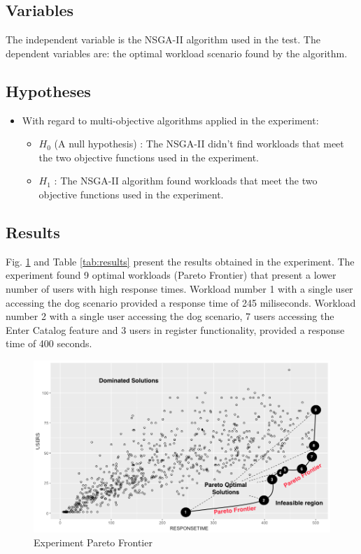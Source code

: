 \documentclass{report}
\begin{document}
\subsection{Variables}

The independent variable is the NSGA-II algorithm used in the test. The dependent variables are: the optimal workload scenario found by the algorithm.

\subsection{Hypotheses}

\begin{itemize}
\item With regard to multi-objective algorithms applied in the experiment:
\begin{itemize}
\item $H_{0}$ (A null hypothesis) : The NSGA-II didn't find workloads that meet the two objective functions used in the experiment.
\item $H_{1}$  : The NSGA-II  algorithm found workloads that meet the two objective functions used in the experiment.
\end{itemize}
\end{itemize}

\subsection{Results}

Fig. \ref{fig:paretofrontier1} and Table \ref{tab:results} present the results obtained in the experiment. The experiment found 9 optimal workloads (Pareto Frontier) that present a lower number of users with high response times. Workload number 1 with a single user accessing the dog scenario provided a response time of 245 miliseconds.  Workload number 2 with a single user accessing the dog scenario, 7 users accessing the Enter Catalog feature and 3 users in register functionality, provided a response time of 400 seconds.



\begin{figure}[h]
\centering
\includegraphics[width=1\textwidth]{./images/pareto0curve.png}
    \caption{Experiment Pareto Frontier}
\label{fig:paretofrontier1}
\end{figure}
\end{document}
